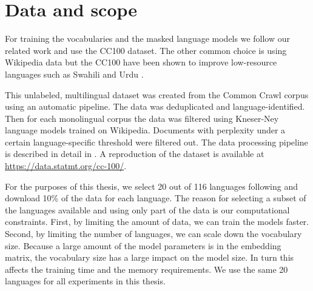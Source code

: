 \section{Data and scope}
\label{sec:data_scope}

For training the vocabularies and the masked language models we follow our related work \cite{conneau_unsupervised_2020,chung_improving_2020,liang_xlm-v_2023} and use the CC100 dataset. The other common choice is using Wikipedia data \cite{devlin_bert_2019,zheng_allocating_2021} but the CC100 have been shown to improve low-resource languages such as Swahili and Urdu \cite{conneau_unsupervised_2020}.

This unlabeled, multilingual dataset was created from the Common Crawl corpus using an automatic pipeline. The data was deduplicated and language-identified. Then for each monolingual corpus the data was filtered using Kneser-Ney language models trained on Wikipedia. Documents with perplexity under a certain language-specific threshold were filtered out. The data processing pipeline is described in detail in \citet{wenzek_ccnet_nodate}. A reproduction of the dataset is available at \url{https://data.statmt.org/cc-100/}.

For the purposes of this thesis, we select 20 out of 116 languages following \citet{limisiewicz_tokenization_2023} and download 10\% of the data for each language. The reason for selecting a subset of the languages available and using only part of the data is our computational constraints. First, by limiting the amount of data, we can train the models faster. Second, by limiting the number of languages, we can scale down the vocabulary size. Because a large amount of the model parameters is in the embedding matrix, the vocabulary size has a large impact on the model size. In turn this affects the training time and the memory requirements. We use the same 20 languages for all experiments in this thesis.

